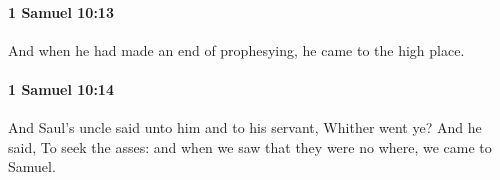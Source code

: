 		\paragraph{1 Samuel 10:13} %
			\label{1SAMUEL-10-13}

			And when he had made an end of prophesying, he came to the high place.


		\paragraph{1 Samuel 10:14} %
			\label{1SAMUEL-10-14}

			And Saul’s uncle said unto him and to his servant, Whither went ye? And he said, To seek the asses: and when we saw that they were no where, we came to Samuel.


